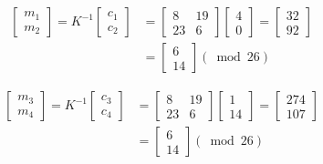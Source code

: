 \documentclass[UTF8]{ctexart}
\begin{document}
\begin{itemize}
\begin{enumerate}
\begin{itemize}
                    $$
                    \begin{aligned}
                        \left[ \begin{array}{c}{m_1}\\ {m_2}\end{array}\right]=K^{-1}\left[ \begin{array}{c}{c_1}\\ {c_2} \end{array}\right]
                                &=\left[ \begin{array}{cc}{8} &{19}\\ {23} &{6}\end{array}\right]\left[ \begin{array}{c}{4}\\ {0} \end{array}\right]
                                    =\left[ \begin{array}{c}{32} \\{92} \end{array}\right]\\
                                        &=\left[ \begin{array}{c}{6} \\{14} \end{array}\right](\bmod 26)
                    \end{aligned}
                    $$

                    $$
                    \begin{aligned}
                        \left[ \begin{array}{c}{m_3}\\ {m_4}\end{array}\right]=K^{-1}\left[ \begin{array}{c}{c_3}\\ {c_4} \end{array}\right]
                                &=\left[ \begin{array}{cc}{8} &{19}\\ {23} &{6}\end{array}\right]\left[ \begin{array}{c}{1}\\ {14} \end{array}\right]
                                    =\left[ \begin{array}{c}{274} \\{107} \end{array}\right]\\
                                        &=\left[ \begin{array}{c}{6} \\{14} \end{array}\right](\bmod 26)
                    \end{aligned}
                    $$


\end{itemize}
\end{enumerate}
\end{itemize}
\end{document}

